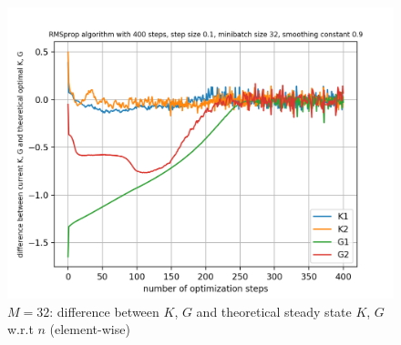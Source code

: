 \documentclass{article}
\begin{document}
\begin{figure}[h!]
\begin{minipage}[t]{.28\paperwidth}
		\includegraphics[width=1.0\textwidth]{Figures/d_M32_sep.png}
		\caption{$M=32$: difference between $K$, $G$ and theoretical steady state $K$, $G$ w.r.t $n$ (element-wise)}
	\end{minipage}
\end{figure}
\end{document}
